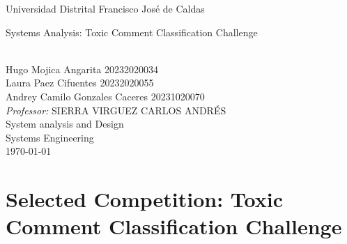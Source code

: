 \documentclass[a4paper,12pt]{article}
\begin{document}
\begin{titlepage}      
        \begin{center}
            
            {\LARGE Universidad Distrital Francisco José de Caldas\\[0.5cm]
			
            \linespread{1.2}\huge {
                Systems Analysis: Toxic Comment Classification Challenge
            
            }}
            \linespread{1}~\\[5cm]
            {\Large 
                Hugo Mojica Angarita  20232020034 \\ Laura Paez Cifuentes 20232020055\\ Andrey Camilo Gonzales Caceres 20231020070
            }\\[8cm] 
            

            {\large 
                \emph{Professor:} SIERRA VIRGUEZ CARLOS ANDRÉS}\\[1cm] %
            
            \large System analysis and Design\\
            \large Systems Engineering\\
            \today
            \vfill
        \end{center}
    \end{titlepage}



\section*{Selected Competition: Toxic Comment Classification Challenge}
\end{document}
